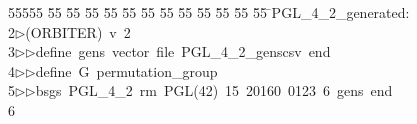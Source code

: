 %
%
\begin{tabbing}
55555 \= 55 \= 55 \= 55 \= 55 \= 55 \= 55 \= 55 \= 55 \= 55 \= 55 \= 55 \= 55 \= \>PGL\_4\_2\_generated:\\[0pt]
2\>$\triangleright$\>(ORBITER)\ v\ 2\ \\[0pt]
3\>$\triangleright$\>$\triangleright$\>define\ gens\ vector\ file\ PGL\_4\_2\_genscsv\ end\ \\[0pt]
4\>$\triangleright$\>$\triangleright$\>define\ G\ permutation\_group\ \\[0pt]
5\>$\triangleright$\>$\triangleright$\>bsgs\ PGL\_4\_2\ rm\ PGL(42)\ 15\ 20160\ 0123\ 6\ gens\ end\ \\[0pt]
6\>\end{tabbing}
